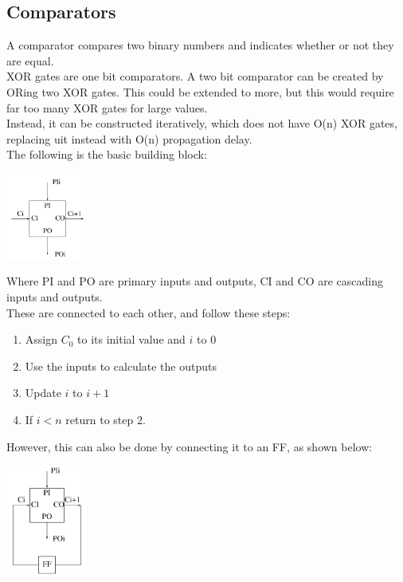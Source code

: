 \documentclass[nobib]{tufte-handout}
\begin{document}
    \subsection{Comparators}
    A comparator compares two binary numbers and indicates whether or not they are
    equal.\\ XOR gates are one bit comparators. A two bit comparator can be created
    by ORing two XOR gates. This could be extended to more, but this would require
    far too many XOR gates for large values.\\ Instead, it can be constructed
    iteratively, which does not have O(n) XOR gates, replacing uit instead with
    O(n) propagation delay.\\ The following is the basic building block:
    \begin{center}
        \includegraphics[width = 100px]{images/iterative_bb.png}
    \end{center}
    Where PI and PO are primary inputs and outputs, CI and CO are cascading inputs and outputs.\\
    These are connected to each other, and follow these steps:
    \begin{enumerate}
        \item Assign $C_0$ to its initial value and $i$ to $0$
        \item Use the inputs to calculate the outputs
        \item Update $i$ to $i+1$
        \item If $i<n$ return to step 2.
    \end{enumerate}
    However, this can also be done by connecting it to an FF, as shown below:
    \begin{center}
        \includegraphics[width = 100px]{images/comparatorFF.png}
    \end{center}
\end{document}
